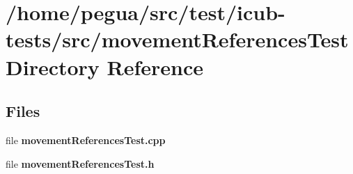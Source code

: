 \section{/home/pegua/src/test/icub-\/tests/src/movement\-References\-Test Directory Reference}
\label{dir_1ff6e3a7912c7481e100b734d4f6c773}
\subsection*{Files}
\begin{DoxyCompactItemize}
\item 
file {\bfseries movement\-References\-Test.\-cpp}
\item 
file {\bfseries movement\-References\-Test.\-h}
\end{DoxyCompactItemize}
